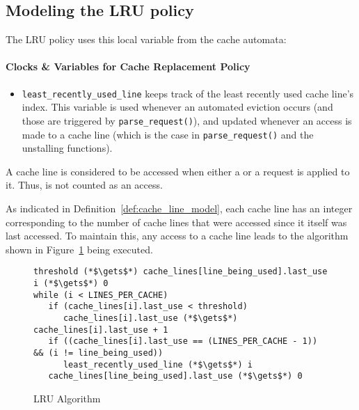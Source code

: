 \subsection{Modeling the LRU policy}
The LRU policy uses this local variable from the cache automata:
\paragraph{Clocks \& Variables for Cache Replacement Policy}
\begin{itemize}
\item
   \lstinline!least_recently_used_line! keeps track of the least recently
   used cache line's index. This variable is used whenever an automated
   eviction occurs (and those are triggered by \lstinline!parse_request()!),
   and updated whenever an access is made to a cache line (which is the case in
   \lstinline!parse_request()! and the unstalling functions).
\end{itemize}

\begin{definition}
A cache line is considered to be accessed when either a \storeinstr{} or a
\loadinstr{} request is applied to it. Thus, \evictinstr{} is not counted as an
access.
\end{definition}

As indicated in Definition~\ref{def:cache_line_model}, each cache line has an
integer corresponding to the number of cache lines that were accessed since it
itself was last accessed. To maintain this, any access to a cache line leads
to the algorithm shown in Figure~\ref{fig:UPPAAL:lru_algo} being executed.

\begin{figure}[hbt!]
\begin{lstlisting}
threshold (*$\gets$*) cache_lines[line_being_used].last_use
i (*$\gets$*) 0
while (i < LINES_PER_CACHE)
   if (cache_lines[i].last_use < threshold)
      cache_lines[i].last_use (*$\gets$*) cache_lines[i].last_use + 1
   if ((cache_lines[i].last_use == (LINES_PER_CACHE - 1)) && (i != line_being_used))
      least_recently_used_line (*$\gets$*) i
   cache_lines[line_being_used].last_use (*$\gets$*) 0
\end{lstlisting}
\caption{LRU Algorithm}
\label{fig:UPPAAL:lru_algo}
\end{figure}

